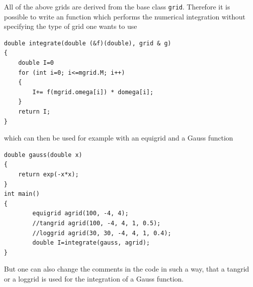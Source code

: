 All of the above grids are derived from the base class \texttt{grid}. Therefore it is possible to write an function which performs the numerical integration without specifying the type of grid one wants to use
\begin{lstlisting}
double integrate(double (&f)(double), grid & g)
{
	double I=0
	for (int i=0; i<=mgrid.M; i++)
	{
		I+= f(mgrid.omega[i]) * domega[i];
	}
	return I;
} 
\end{lstlisting}
which can then be used for example with an equigrid and a Gauss function
\begin{lstlisting}
double gauss(double x)
{
	return exp(-x*x);
}
int main()
{
        equigrid agrid(100, -4, 4);
        //tangrid agrid(100, -4, 4, 1, 0.5);
        //loggrid agrid(30, 30, -4, 4, 1, 0.4);
        double I=integrate(gauss, agrid);
}
\end{lstlisting}
But one can also change the comments in the code in such a way, that a tangrid or a loggrid is used for the integration of a Gauss function.



